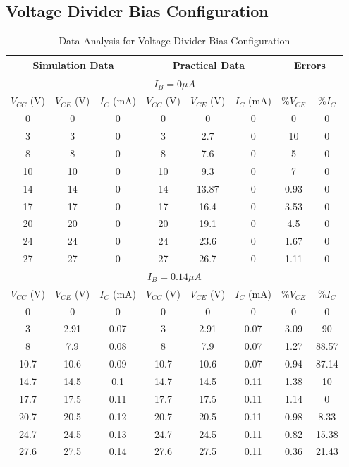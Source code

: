 \documentclass[12pt]{article}
\begin{document}
\newpage
\subsection{Voltage Divider Bias Configuration}
\bgroup
\def\arraystretch{1.5}
\begin{table}[h!]
    \centering
    \begin{tabular}{|c|c|c||c|c|c||c|c|}
        \hline
        \multicolumn{3}{|c||}{\textbf{Simulation Data}} & \multicolumn{3}{|c||}{\textbf{Practical Data}} & \multicolumn{2}{|c|}{\textbf{Errors}} \\ \hline\hline
        \multicolumn{8}{|c|}{\textbf{$I_B = 0\mu A$}} \\ \hline
        $V_{CC}$ (V) & $V_{CE}$ (V) & $I_C$ (mA) & $V_{CC}$ (V) & $V_{CE}$ (V) & $I_C$ (mA) & \%$V_{CE}$ & \%$I_C$ \\ \hline
        0 & 0 & 0 & 0 & 0 & 0 & 0 & 0 \\
        3 & 3 & 0 & 3 & 2.7 & 0 & 10 & 0 \\
        8 & 8 & 0 & 8 & 7.6 & 0 & 5 & 0 \\
        10 & 10 & 0 & 10 & 9.3 & 0 & 7 & 0 \\
        14 & 14 & 0 & 14 & 13.87 & 0 & 0.93 & 0 \\
        17 & 17 & 0 & 17 & 16.4 & 0 & 3.53 & 0 \\
        20 & 20 & 0 & 20 & 19.1 & 0 & 4.5 & 0 \\
        24 & 24 & 0 & 24 & 23.6 & 0 & 1.67 & 0 \\
        27 & 27 & 0 & 27 & 26.7 & 0 & 1.11 & 0 \\ \hline\hline
        \multicolumn{8}{|c|}{\textbf{$I_B = 0.14\mu A$}} \\ \hline
        $V_{CC}$ (V) & $V_{CE}$ (V) & $I_C$ (mA) & $V_{CC}$ (V) & $V_{CE}$ (V) & $I_C$ (mA) & \%$V_{CE}$ & \%$I_C$ \\ \hline
        0 & 0 & 0 & 0 & 0 & 0 & 0 & 0 \\
        3 & 2.91 & 0.07 & 3 & 2.91 & 0.07 & 3.09 & 90 \\
        8 & 7.9 & 0.08 & 8 & 7.9 & 0.07 & 1.27 & 88.57 \\
        10.7 & 10.6 & 0.09 & 10.7 & 10.6 & 0.07 & 0.94 & 87.14 \\
        14.7 & 14.5 & 0.1 & 14.7 & 14.5 & 0.11 & 1.38 & 10 \\
        17.7 & 17.5 & 0.11 & 17.7 & 17.5 & 0.11 & 1.14 & 0 \\
        20.7 & 20.5 & 0.12 & 20.7 & 20.5 & 0.11 & 0.98 & 8.33 \\
        24.7 & 24.5 & 0.13 & 24.7 & 24.5 & 0.11 & 0.82 & 15.38 \\
        27.6 & 27.5 & 0.14 & 27.6 & 27.5 & 0.11 & 0.36 & 21.43 \\ \hline
    \end{tabular}
    \caption{Data Analysis for Voltage Divider Bias Configuration}
    \label{Voltage Divider Bias}
\end{table}
\end{document}
